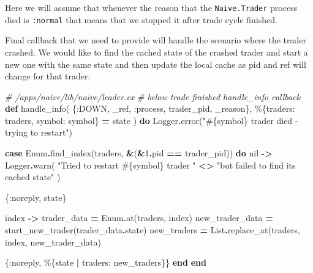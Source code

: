 \documentclass[
]{book}
\newenvironment{Shaded}{\begin{snugshade}}{\end{snugshade}}
\newcommand{\CommentTok}[1]{\textcolor[rgb]{0.56,0.35,0.01}{\textit{#1}}}
\newcommand{\ConstantTok}[1]{\textcolor[rgb]{0.00,0.00,0.00}{#1}}
\newcommand{\DecValTok}[1]{\textcolor[rgb]{0.00,0.00,0.81}{#1}}
\newcommand{\KeywordTok}[1]{\textcolor[rgb]{0.13,0.29,0.53}{\textbf{#1}}}
\newcommand{\NormalTok}[1]{#1}
\newcommand{\OperatorTok}[1]{\textcolor[rgb]{0.81,0.36,0.00}{\textbf{#1}}}
\newcommand{\OtherTok}[1]{\textcolor[rgb]{0.56,0.35,0.01}{#1}}
\newcommand{\StringTok}[1]{\textcolor[rgb]{0.31,0.60,0.02}{#1}}
\newcommand{\VariableTok}[1]{\textcolor[rgb]{0.00,0.00,0.00}{#1}}
\begin{document}
Here we will assume that whenever the reason that the \texttt{Naive.Trader} process died is \texttt{:normal} that means that we stopped it after trade cycle finished.

Final callback that we need to provide will handle the scenario where the trader crashed. We would like to find the cached state of the crashed trader and start a new one with the same state and then update the local cache as pid and ref will change for that trader:

\begin{Shaded}
\begin{Highlighting}[]
  \CommentTok{\# /apps/naive/lib/naive/leader.ex}
  \CommentTok{\# below trade finished handle\_info callback}
  \KeywordTok{def}\NormalTok{ handle\_info(}
\NormalTok{        \{}\VariableTok{:DOWN}\NormalTok{, \_ref, }\VariableTok{:process}\NormalTok{, trader\_pid, \_reason\},}
\NormalTok{        \%\{}\VariableTok{traders:}\NormalTok{ traders, }\VariableTok{symbol:}\NormalTok{ symbol\} }\OperatorTok{=}\NormalTok{ state}
\NormalTok{      ) }\KeywordTok{do}
    \ConstantTok{Logger}\OperatorTok{.}\NormalTok{error(}\StringTok{"}\OtherTok{\#\{}\NormalTok{symbol}\OtherTok{\}}\StringTok{ trader died {-} trying to restart"}\NormalTok{)}

    \KeywordTok{case} \ConstantTok{Enum}\OperatorTok{.}\NormalTok{find\_index(traders, }\OperatorTok{\&}\NormalTok{(}\OperatorTok{\&}\DecValTok{1}\OperatorTok{.}\NormalTok{pid }\OperatorTok{==}\NormalTok{ trader\_pid)) }\KeywordTok{do}
      \ConstantTok{nil} \OperatorTok{{-}\textgreater{}}
        \ConstantTok{Logger}\OperatorTok{.}\NormalTok{warn(}
          \StringTok{"Tried to restart }\OtherTok{\#\{}\NormalTok{symbol}\OtherTok{\}}\StringTok{ trader "} \OperatorTok{\textless{}\textgreater{}}
            \StringTok{"but failed to find its cached state"}
\NormalTok{        )}

\NormalTok{        \{}\VariableTok{:noreply}\NormalTok{, state\}}

\NormalTok{      index }\OperatorTok{{-}\textgreater{}}
\NormalTok{        trader\_data }\OperatorTok{=} \ConstantTok{Enum}\OperatorTok{.}\NormalTok{at(traders, index)}
\NormalTok{        new\_trader\_data }\OperatorTok{=}\NormalTok{ start\_new\_trader(trader\_data}\OperatorTok{.}\NormalTok{state)}
\NormalTok{        new\_traders }\OperatorTok{=} \ConstantTok{List}\OperatorTok{.}\NormalTok{replace\_at(traders, index, new\_trader\_data)}

\NormalTok{        \{}\VariableTok{:noreply}\NormalTok{, \%\{state }\OperatorTok{|} \VariableTok{traders:}\NormalTok{ new\_traders\}\}}
    \KeywordTok{end}
  \KeywordTok{end}
\end{Highlighting}
\end{Shaded}
\end{document}
